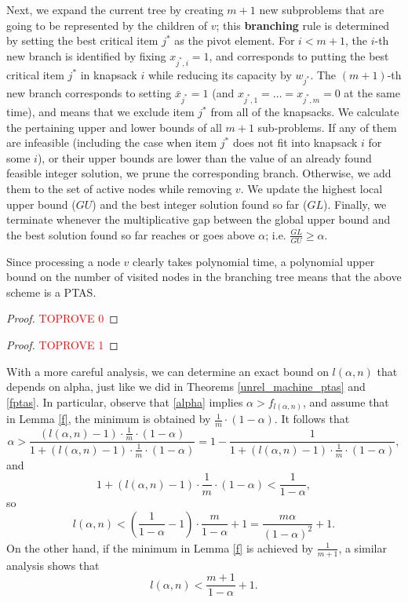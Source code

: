 \documentclass[a4paper,UKenglish,cleveref, autoref, thm-restate, pdfa]{lipics-v2021}
\theoremstyle{plain}
\begin{document}
Next, we expand the current tree by creating $m+1$ new subproblems that are going to be represented by the children of $v$; this \textbf{branching} rule is determined by setting the best critical item $j^*$ as the pivot element. For $i<m+1$, the $i$-th new branch is identified by fixing $x_{j^*, i} = 1$, and corresponds to putting the best critical item $j^*$ in knapsack $i$ while reducing its capacity by $w_{j^*}$. The $(m+1)$-th new branch corresponds to setting $\bar{x}_{j^*} =1$ (and $x_{j^*, 1} = \ldots = x_{j^*, m}=0$ at the same time), and means that we exclude item $j^*$ from all of the knapsacks. We calculate the pertaining upper and lower bounds of all $m+1$ sub-problems. If any of them are infeasible (including the case when item $j^*$ does not fit into knapsack $i$ for some $i$), or their upper bounds are lower than the value of an already found feasible integer solution, we prune the corresponding branch. Otherwise, we add them to the set of active nodes while removing $v$. We update the highest local upper bound ($GU$) and the best integer solution found so far ($GL$). Finally, we terminate whenever the multiplicative gap between the global upper bound and the best solution found so far reaches or goes above $\alpha$; i.e. $\frac{GL}{GU} \ge \alpha$.

Since processing a node $v$ clearly takes polynomial time, a polynomial upper bound on the number of visited nodes in the branching tree means that the above scheme is a PTAS. 

\begin{proof}\textcolor{red}{TOPROVE 0}\end{proof}

\begin{proof}\textcolor{red}{TOPROVE 1}\end{proof}

\begin{remark}
    With a more careful analysis, we can determine an exact bound on $l(\alpha, n)$ that depends on alpha, just like we did in Theorems \ref{unrel_machine_ptas} and \ref{fptas}. In particular, observe that \eqref{alpha} implies $\alpha > f_{l(\alpha, n)}$, and assume that in Lemma \ref{f}, the minimum is obtained by $\frac{1}{m}\cdot (1-\alpha)$. It follows that 
    \[
    \alpha > \frac{(l(\alpha,n)-1)\cdot \frac{1}{m}\cdot (1-\alpha)}{1+(l(\alpha,n)-1)\cdot \frac{1}{m}\cdot (1-\alpha)} = 1- \frac{1}{1+(l(\alpha,n)-1)\cdot \frac{1}{m}\cdot (1-\alpha)},
    \]
    and 
    \[
    1+(l(\alpha,n)-1)\cdot \frac{1}{m}\cdot (1-\alpha) < \frac{1}{1-\alpha},
    \]
    so
    \[
    l(\alpha,n) < \left(\frac{1}{1-\alpha} -1\right)\cdot \frac{m}{1-\alpha} + 1= \frac{m\alpha}{(1-\alpha)^2}+1.
    \]
    On the other hand, if the minimum in Lemma \ref{f} is achieved by $\frac{1}{m+1}$, a similar analysis shows that 
    \[
    l(\alpha, n) < \frac{m+1}{1-\alpha} + 1.
    \]
\end{remark}
 
\end{document}
